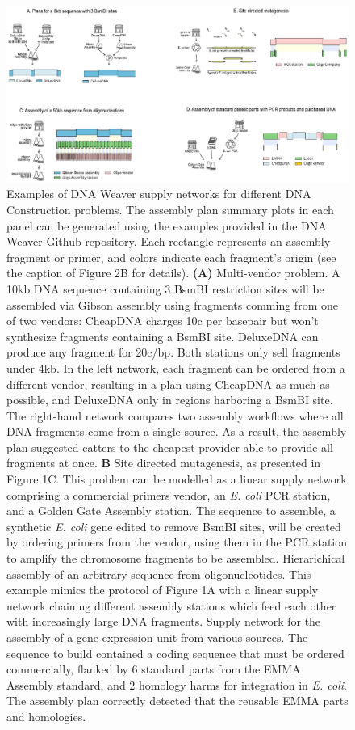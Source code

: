 \begin{figure}[!tpb]
  \includegraphics[width=\textwidth]{figures/figure_3_example_supply_networks.eps}
  \caption{
Examples of DNA Weaver supply networks for different DNA Construction problems. The assembly plan summary plots in each panel can be generated using the examples provided in the DNA Weaver Github repository. Each rectangle represents an assembly fragment or primer, and colors indicate each fragment's origin (see the caption of Figure 2B for details).
\textbf{(A)} Multi-vendor problem. A 10kb DNA sequence containing 3 BsmBI restriction sites will be assembled via Gibson assembly using fragments comming from one of two vendors: CheapDNA charges 10c per basepair but won't synthesize fragments containing a BsmBI site. DeluxeDNA can produce any fragment for 20c/bp. Both stations only sell fragments under 4kb. In the left network, each fragment can be ordered from a different vendor, resulting in a plan using CheapDNA as much as possible, and DeluxeDNA only in regions harboring a BsmBI site. The right-hand network compares two assembly workflows where all DNA fragments come from a single source. As a result, the assembly plan suggested catters to the cheapest provider able to provide all fragments at once.
\textbf{B} Site directed mutagenesis, as presented in Figure 1C. This problem can be modelled as a linear supply network comprising a commercial primers vendor, an \textit{E. coli} PCR station, and a Golden Gate Assembly station. The sequence to assemble, a synthetic \textit{E. coli} gene edited to remove BsmBI sites, will be created by ordering primers from the vendor, using them in the PCR station to amplify the chromosome fragments to be assembled.
 Hierarichical assembly of an arbitrary sequence from oligonucleotides. This example mimics the protocol of Figure 1A with a linear supply network chaining different assembly stations which feed each other with increasingly large DNA fragments.
 Supply network for the assembly of a gene expression unit from various sources. The sequence to build contained a coding sequence that must be ordered commercially, flanked by 6 standard parts from the EMMA Assembly standard, and 2 homology harms for integration in \textit{E. coli}. The assembly plan correctly detected that the reusable EMMA parts and homologies.}
  \label{app_screenshots}
\end{figure}


